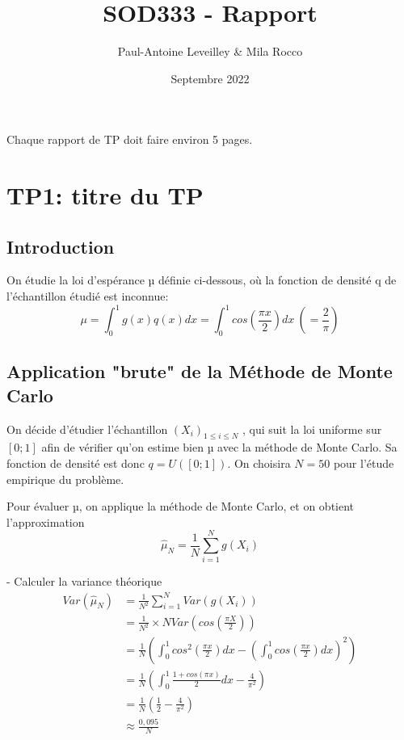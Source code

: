 \documentclass{article}
\title{SOD333 - Rapport}
\author{Paul-Antoine Leveilley \& Mila Rocco}
\date{Septembre 2022}
\begin{document}
\maketitle

\begin{center}
Chaque rapport de TP doit faire environ 5 pages.
\end{center}







\newpage
\section{TP1: titre du TP}

\subsection{Introduction}
On étudie la loi d'espérance µ définie ci-dessous, où la fonction de densité q de l'échantillon étudié est inconnue:
$$\mu = \int_0^1 g(x)q(x)dx = \int_0^1 cos(\frac{\pi x}{2})dx\ (=\frac{2}{\pi})$$

 \subsection{Application "brute" de la Méthode de Monte Carlo}
On décide d'étudier l'échantillon $(X_i)_{1\leq i \leq N}$ , qui suit la loi uniforme sur $[0;1]$ afin de vérifier qu'on estime bien µ avec la méthode de Monte Carlo. Sa fonction de densité est donc $q=U([0;1])$. On choisira $N=50$ pour l'étude empirique du problème.

Pour évaluer µ, on applique la méthode de Monte Carlo, et on obtient l'approximation 
$$\hat{\mu}_N = \frac{1}{N} \sum_{i=1}^N g(X_i)$$

- Calculer la variance théorique\\
\begin{align*} 
  Var(\hat{\mu}_N) &= \frac1{N^2} \sum_{i=1}^N Var(g(X_i))\\ 
  &= \frac1{N^2}\times N Var(cos(\frac{\pi X}2)) \\ 
  &= \frac1{N} \left ( \int_0^1 cos^2(\frac{\pi x}2)dx - \left ( \int_0^1 cos(\frac{\pi x}2)dx \right )^2 \right )\\
  &= \frac1{N} \left ( \int_0^1 \frac{1+cos(\pi x)}{2}dx - 
   \frac4{\pi^2} \right )\\
  &= \frac1{N} \left ( \frac{1}{2} - 
   \frac4{\pi^2} \right )\\
  &\approx \frac{0,095}{N}
\end{align*}
\end{document}
